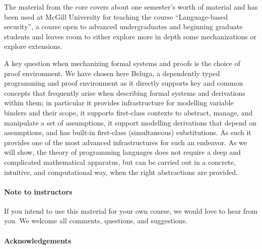 The material from the core covers about one semester's worth of material and has been used at McGill University for teaching the course ``Language-based security'', a course open to advanced undergraduates and beginning graduate students and leaves room to either explore more in depth some mechanizations or explore extensions.

A key question when mechanizing formal systems and proofs is the choice of proof environment.  We have chosen here Beluga, a dependently typed programming and proof environment as it directly supports key and common concepts that frequently arise when describing formal systems and derivations within them; in particular it provides infrastructure for modelling variable binders and their scope, it supports first-class contexts to abstract, manage, and manipulate a set of assumptions, it support modelling derivations that depend on assumptions, and has built-in first-class (simultaneous) substitutions.  As such it provides one of the most advanced infrastructures for such an endeavor. As we will show,  the theory of programming languages does
not require a deep and complicated mathematical apparatus, but can be carried out in a concrete, intuitive, and computational way, when the right abstractions are provided. 



\paragraph{Note to instructors}
If you intend to use this material for your own course, we would love to hear from you. We welcome all comments, questions, and suggestions.

\paragraph{Acknowledgements}

